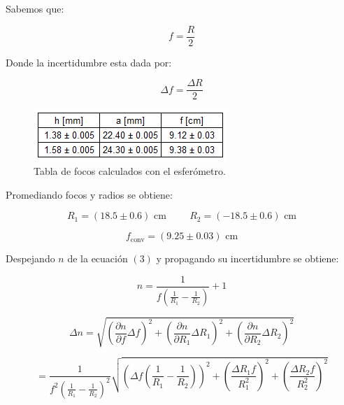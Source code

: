 \documentclass[DIV=calc, paper=a4, fontsize=10pt]{scrartcl}
\begin{document}
Sabemos que:

\begin{equation*}
    f=\frac{R}{2}
\end{equation*}

Donde la incertidumbre esta dada por:

\begin{equation*}
    \Delta f = \frac{\Delta R}{2}
\end{equation*}

\begin{figure}[h!]
    \centering
    \includegraphics[scale=1]{tablas/esferometro.PNG}
    \caption{Tabla de focos calculados con el esferómetro.}
\end{figure}

Promediando focos y radios se obtiene:

\begin{equation*}
    R_1 = (18.5 \pm 0.6) \text{ cm} \hspace{1cm} R_2 = (-18.5 \pm 0.6) \text{ cm}
\end{equation*}

\begin{equation*}
    f_{\text{conv}}=(9.25 \pm 0.03) \text{ cm}
\end{equation*}

Despejando $n$ de la ecuación $(3)$ y propagando su incertidumbre se obtiene:

\begin{equation*}
    n= \frac{1}{f\left(\frac{1}{R_1} - \frac{1}{R_2}\right)} + 1 
\end{equation*}

\begin{equation*}
    \Delta n = \sqrt{\left(\frac{\partial n}{\partial f} \Delta f\right)^{2} + \left(\frac{\partial n}{\partial R_1}  \Delta R_1\right)^{2} + \left(\frac{\partial n}{\partial R_2} \Delta R_2\right)^{2}}
\end{equation*}

\begin{equation*}
    = \frac{1}{f^2\left(\frac{1}{R_1} - \frac{1}{R_2}\right)^{2}} \sqrt{\left(\Delta f (\frac{1}{R_1}- \frac{1}{R_2})\right)^{2}+\left(\frac{\Delta R_1 f}{R_{1}^{2}}\right)^{2} + \left(\frac{\Delta R_2 f}{R_{2}^{2}}\right)^{2}}
\end{equation*}
\end{document}
